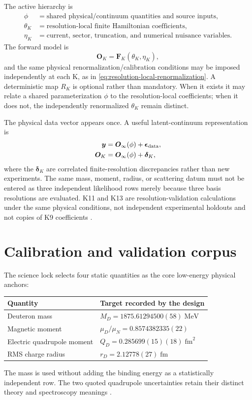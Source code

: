 \documentclass[11pt,oneside]{book}
\newcommand{\MeV}{\mathrm{MeV}}
\newcommand{\fm}{\mathrm{fm}}
\begin{document}
The active hierarchy is
\begin{equation}
 \begin{aligned}
 \phi&=\text{shared physical/continuum quantities and source inputs},\\
 \theta_K&=\text{resolution-local finite Hamiltonian coefficients},\\
 \eta_K&=\text{current, sector, truncation, and numerical nuisance variables}.
 \end{aligned}
 \label{eq:parameter-hierarchy}
\end{equation}
The forward model is
\begin{equation}
 \bm O_K=\bm F_K(\theta_K,\eta_K),
 \label{eq:forward-hierarchy}
\end{equation}
and the same physical renormalization/calibration conditions may be imposed independently at each K, as in \cref{eq:resolution-local-renormalization}.  A deterministic map $R_K$ is optional rather than mandatory.  When it exists it may relate a shared parameterization $\phi$ to the resolution-local coefficients; when it does not, the independently renormalized $\theta_K$ remain distinct.

The physical data vector appears once.  A useful latent-continuum representation is
\begin{align}
 \bm y&=\bm O_\infty(\phi)+\bm\epsilon_{\rm data},
 \label{eq:shared-data}\\
 \bm O_K&=\bm O_\infty(\phi)+\bm\delta_K,
 \label{eq:resolution-discrepancy}
\end{align}
where the $\bm\delta_K$ are correlated finite-resolution discrepancies rather than new experiments.  The same mass, moment, radius, or scattering datum must not be entered as three independent likelihood rows merely because three basis resolutions are evaluated.  K11 and K13 are resolution-validation calculations under the same physical conditions, not independent experimental holdouts and not copies of K9 coefficients \cite{DWC400ScienceLock2026,DWC400S2Record2026}.

\section{Calibration and validation corpus}

The science lock selects four static quantities as the core low-energy physical anchors:
\begin{longtable}{p{}p{}}
\toprule
\textbf{Quantity}&\textbf{Target recorded by the design}\\
\midrule
Deuteron mass&$M_D=1875.61294500(58)\;\MeV$\\
Magnetic moment&$\mu_D/\mu_N=0.8574382335(22)$\\
Electric quadrupole moment&$Q_D=0.285699(15)(18)\;\fm^2$\\
RMS charge radius&$r_D=2.12778(27)\;\fm$\\
\bottomrule
\end{longtable}
The mass is used without adding the binding energy as a statistically independent row.  The two quoted quadrupole uncertainties retain their distinct theory and spectroscopy meanings \cite{NISTCODATA2022,PuchalskiKomasaPachucki2020,DWC400ScienceLock2026}.
\end{document}
